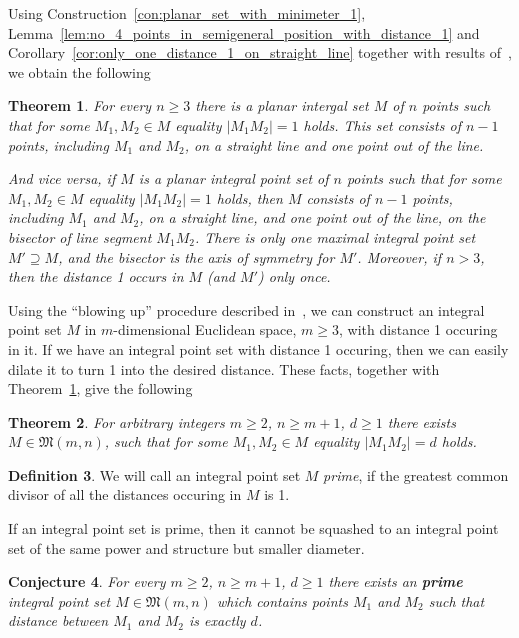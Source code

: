 \documentclass[a4paper,14pt]{article} %
\theoremstyle{plain}
\newtheorem{theorem}{Theorem}[section]
\newtheorem{conjecture}[theorem]{Conjecture}
\theoremstyle{definition}
\newtheorem{definition}[theorem]{Definition}
\begin{document}
Using Construction~\ref{con:planar_set_with_minimeter_1},
Lemma~\ref{lem:no_4_points_in_semigeneral_position_with_distance_1} and Corollary~\ref{cor:only_one_distance_1_on_straight_line}
together with results of~\cite[Section 6]{antonov2008maximal},
we obtain the following

\begin{theorem}
	\label{thm:minimeter_1_planar}
	For every $n\geq 3$ there is a planar intergal set $M$ of $n$ points
	such that for some $M_1,M_2 \in M$ equality $|M_1 M_2|=1$ holds.
	This set consists of $n-1$ points, including $M_1$ and $M_2$, on a straight line and one point out of the line.

	And vice versa, if $M$ is a planar integral point set of $n$ points
	such that for some $M_1,M_2 \in M$ equality $|M_1 M_2|=1$ holds,
	then $M$ consists of $n-1$ points, including $M_1$ and $M_2$, on a straight line,
	and one point out of the line, on the bisector of line segment $M_1 M_2$.
	There is only one maximal integral point set $M' \supseteq M$,
	and the bisector is the axis of symmetry for $M'$.
	Moreover, if $n > 3$, then the distance 1 occurs in $M$ (and $M'$) only once.
\end{theorem}

Using the ``blowing up'' procedure described in~\cite[theorem 1.3]{kurz2008bounds},
we can construct an integral point set $M$ in $m$-dimensional Euclidean space, $m\geq 3$,
with distance 1 occuring in it.
If we have an integral point set with distance 1 occuring,
then we can easily dilate it to turn 1 into the desired distance.
These facts, together with Theorem~\ref{thm:minimeter_1_planar}, give the following

\begin{theorem}
	For arbitrary integers $m \geq 2$, $n \geq m+1$, $d \geq 1$
	there exists $M\in\mathfrak{M}(m,n)$,
	such that for some $M_1, M_2\in M$ equality $|M_1 M_2| = d$ holds.
\end{theorem}


\begin{definition}
	\cite{noll1989nclusters}
	We will call an integral point set $M$ \textit{prime}, if the greatest common divisor
	of all the distances occuring in $M$ is 1.
\end{definition}

If an integral point set is prime,
then it cannot be squashed to an integral point set of the same power and structure but smaller diameter.

\begin{conjecture}
	\label{hyp:prime_planar}
	For every $m \geq 2$, $n \geq m+1$, $d \geq 1$ there exists an \textbf{prime}
	integral point set $M\in\mathfrak{M}(m,n)$ which
	contains points $M_1$ and $M_2$ such that distance between $M_1$ and $M_2$ is exactly $d$.
\end{conjecture}
\end{document}
